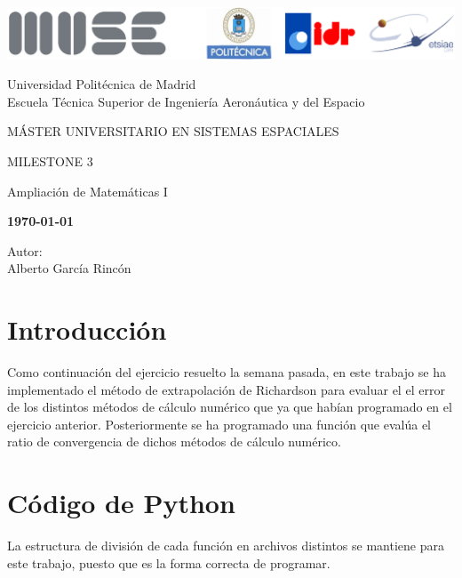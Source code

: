 \documentclass[12pt,a4paper]{article}
\begin{document}
	
\begin{titlepage}
	\centering
	\includegraphics[width=\textwidth]{FIGURES/Portada/Logo_portada.png} 
	\vspace{1.5cm}
	
	Universidad Politécnica de Madrid
	\\Escuela Técnica Superior de Ingeniería Aeronáutica y del Espacio
	\vspace{2cm}
	
	{\large MÁSTER UNIVERSITARIO EN SISTEMAS ESPACIALES}
	\vspace{2cm}
	
	{\LARGE MILESTONE 3}
	\vspace{1cm}
	
	{\large Ampliación de Matemáticas I}
	\vspace{4cm}
	
	\begin{center}
		\large{\textbf{\today}} \\
	\end{center}
	
	Autor: \\ Alberto García Rincón
	\vfill
\end{titlepage}

\newpage
\pagestyle{empty}
\tableofcontents	

\newpage
{}
\setcounter{page}{1}
\pagestyle{fancy} 

\section{Introducción}
Como continuación del ejercicio resuelto la semana pasada, en este trabajo se ha implementado el método de extrapolación de Richardson para evaluar el el error de los distintos métodos de cálculo numérico que ya que habían programado en el ejercicio anterior. Posteriormente se ha programado una función que evalúa el ratio de convergencia de dichos métodos de cálculo numérico. 


\section{Código de Python}
La estructura de división de cada función en archivos distintos se mantiene para este trabajo, puesto que es la forma correcta de programar.
\end{document}
